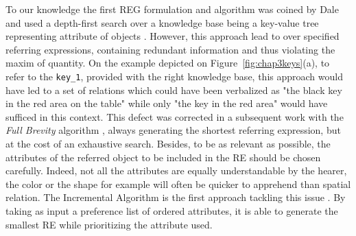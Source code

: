 \documentclass[a4paper,11pt,twoside]{StyleThese}
\begin{document}
To our knowledge the first REG formulation and algorithm was coined by Dale and used a depth-first search over a knowledge base being a key-value tree representing attribute of objects \cite{dale1989cooking}. However, this approach lead to over specified referring expressions, containing redundant information and thus violating the maxim of quantity. On the example depicted on Figure~\ref{fig:chap3keys}(a), to refer to the \verb'key_1', provided with the right knowledge base, this approach would have led to a set of relations which could have been verbalized as "the black key in the red area on the table" while only "the key in the red area" would have sufficed in this context. This defect was corrected in a subsequent work with the \textit{Full Brevity} algorithm \cite{dale1992generating}, always generating the shortest referring expression, but at the cost of an exhaustive search. Besides, to be as relevant as possible, the attributes of the referred object to be included in the RE should be chosen carefully. Indeed, not all the attributes are equally understandable by the hearer, the color or the shape for example will often be quicker to apprehend than spatial relation. The Incremental Algorithm is the first approach tackling this issue \cite{dale1995computational}. By taking as input a preference list of ordered attributes, it is able to generate the smallest RE while prioritizing the attribute used.
\end{document}
